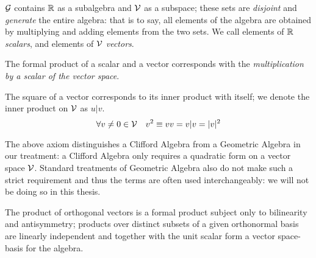 \begin{axiom}\label{a:ga-axiom1}
	$\mathcal{G}$ contains $\mathbb{R}$ as a subalgebra and $\mathcal{V}$ as a subspace; these sets are \emph{disjoint} and \emph{generate} the entire algebra: that is to say, all elements of the algebra are obtained by multiplying and adding elements from the two sets. We call elements of $\mathbb{R}$ \emph{scalars}, and elements of $\mathcal{V}$ \emph{vectors}.
\end{axiom}

\begin{axiom}\label{a:ga-axiom2}
	The formal product of a scalar and a vector corresponds with the \emph{multiplication by a scalar of the vector space}.
\end{axiom}

\begin{axiom}\label{a:ga-axiom3}
    The square of a vector corresponds to its inner product with itself; we denote the inner product on $\mathcal{V}$ as $u|v$.
	\[\forall v \neq 0 \in \mathcal{V} \quad v^2 \equiv vv = v|v = |v|^2\]
\end{axiom}


\begin{remark}\label{r:ga-axiom3}
	The above axiom distinguishes a Clifford Algebra from a Geometric Algebra in our treatment: a Clifford Algebra only requires a quadratic form on a vector space $\mathcal{V}$. Standard treatments of Geometric Algebra also do not make such a strict requirement and thus the terms are often used interchangeably: we will not be doing so in this thesis.
\end{remark}

\begin{axiom}\label{a:freest}
	The product of orthogonal vectors is a formal product subject only to bilinearity and antisymmetry; products over distinct subsets of a given orthonormal basis are linearly independent and together with the unit scalar form a vector space-basis for the algebra.
\end{axiom}

